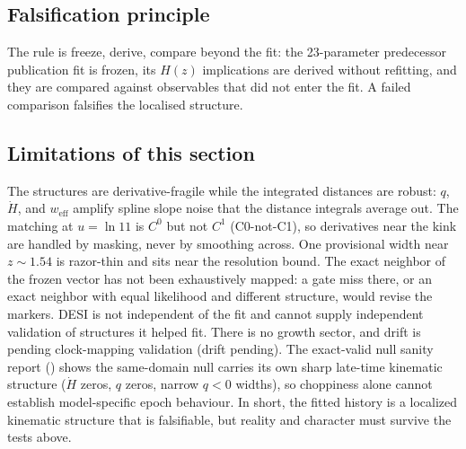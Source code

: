 \subsection{Falsification principle}

The rule is freeze, derive, compare beyond the fit: the 23-parameter
predecessor publication fit is frozen, its $H(z)$ implications are derived without
refitting, and they are compared against observables that did not enter
the fit. A failed comparison falsifies the localised structure.

\subsection{Limitations of this section}

The structures are derivative-fragile while the integrated distances
are robust: $q$, $\dot{H}$, and $w_{\mathrm{eff}}$ amplify spline
slope noise that the distance integrals average out. The matching at
$u = \ln 11$ is $C^{0}$ but not $C^{1}$ (C0-not-C1), so derivatives near
the kink are handled by masking, never by smoothing across. One
provisional width near $z \sim 1.54$ is razor-thin and sits near the
resolution bound. The exact neighbor of the frozen vector has not been
exhaustively mapped: a gate miss there, or an exact neighbor with equal
likelihood and different structure, would revise the markers. DESI is
not independent of the fit and cannot supply independent validation
of structures it helped fit. There is no growth sector, and drift is
pending clock-mapping validation (drift pending). The exact-valid null
sanity report
()
shows the same-domain null carries its own sharp late-time kinematic
structure ($\dot{H}$ zeros, $q$ zeros, narrow $q < 0$ widths), so
choppiness alone cannot establish model-specific epoch behaviour. In
short, the fitted history is a localized kinematic structure that is
falsifiable, but reality and character must survive the tests above.
